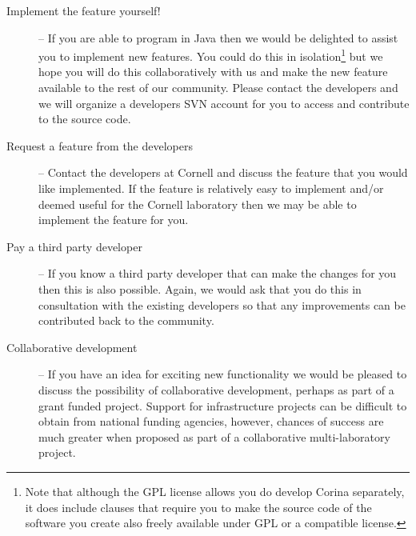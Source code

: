 \begin{description}
 \item[Implement the feature yourself!] -- If you are able to program in Java then we would be delighted to assist you to implement new features.  You could do this in isolation\footnote{Note that although the GPL license allows you do develop Corina separately, it does include clauses that require you to make the source code of the software you create also freely available under GPL or a compatible license.} but we hope you will do this collaboratively with us and make the new feature available to the rest of our community.  Please contact the developers and we will organize a developers SVN account for you to access and contribute to the source code.
 \item[Request a feature from the developers] -- Contact the developers at Cornell and discuss the feature that you would like implemented.  If the feature is relatively easy to implement and/or deemed useful for the Cornell laboratory then we may be able to implement the feature for you.
 \item[Pay a third party developer] -- If you know a third party developer that can make the changes for you then this is also possible.  Again, we would ask that you do this in consultation with the existing developers so that any improvements can be contributed back to the community.
 \item[Collaborative development] -- If you have an idea for exciting new functionality we would be pleased to discuss the possibility of collaborative development, perhaps as part of a grant funded project.  Support for infrastructure projects can be difficult to obtain from national funding agencies, however, chances of success are much greater when proposed as part of a collaborative multi-laboratory project.
\end{description}


